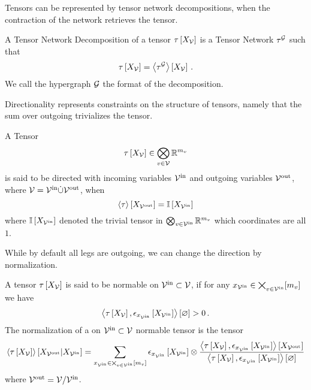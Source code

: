 
Tensors can be represented by tensor network decompositions, when the contraction of the network retrieves the tensor.

\begin{definition}\label{def:tnDecomposition}
	A Tensor Network Decomposition of a tensor $\tau\left[X_{\mathcal{V}}\right]$ is a Tensor Network $\tau^{\mathcal{G}}$ such that
		\[ \tau\left[X_{\mathcal{V}}\right]= \left\langle \tau^{\mathcal{G}}\right\rangle \left[ X_{\mathcal{V}} \right] \, . \]
	We call the hypergraph $\mathcal{G}$ the format of the decomposition.
\end{definition}






Directionality represents constraints on the structure of tensors, namely that the sum over outgoing trivializes the tensor.

\begin{definition}\label{def:directedTensor}
	A Tensor
		\[ \tau\left[X_{\mathcal{V}}\right] \in\bigotimes_{v\in\mathcal{V}}\mathbb{R}^{m_{v}} \]
	is said to be directed with incoming variables $\mathcal{V}^{\mathrm{in}}$ and outgoing variables $\mathcal{V}^{\mathrm{out}}$, where $\mathcal{V}=\mathcal{V}^{\mathrm{in}}\dot{\cup}\mathcal{V}^{\mathrm{out}}$, when
		\[ \left\langle \tau\right\rangle \left[ X_{\mathcal{V}^{\mathrm{out}}} \right] =  \mathbb{I}\left[X_{\mathcal{V}^{\mathrm{in}}}\right] \]
	where $\mathbb{I}\left[X_{\mathcal{V}^{\mathrm{in}}}\right]$ denoted the trivial tensor in  $\bigotimes_{v\in\mathcal{V}^{\mathrm{in}}}\mathbb{R}^{m_{v}}$ which coordinates are all $1$.
\end{definition}

While by default all legs are outgoing, we can change the direction by normalization.

\begin{definition}\label{def:normalization}
	A tensor $\tau\left[X_{\mathcal{V}}\right]$ is said to be normable on $\mathcal{V}^{\mathrm{in}}\subset\mathcal{V}$, if for any $x_{\mathcal{V}^{\mathrm{in}}}\in\bigtimes_{v\in\mathcal{V}^{\mathrm{in}}}[m_{v}]$ we have
		\[ \left\langle \tau\left[X_{\mathcal{V}}\right],\epsilon_{x_{\mathcal{V}^{\mathrm{in}}}}\left[X_{\mathcal{V}^{\mathrm{in}}}\right]\right\rangle \left[ \varnothing \right] > 0 \, . \]
	The normalization of a on $\mathcal{V}^{\mathrm{in}}\subset\mathcal{V}$ normable tensor is the tensor
	\begin{align*}
		\left\langle \tau\left[X_{\mathcal{V}}\right]\right\rangle \left[ X_{\mathcal{V}^{\mathrm{out}}} | X_{\mathcal{V}^{\mathrm{in}}} \right] =
		\sum_{x_{\mathcal{V}^{\mathrm{in}}}\in\bigtimes_{v\in\mathcal{V}^{\mathrm{in}}}[m_{v}]}
		\epsilon_{x_{\mathcal{V}^{\mathrm{in}}}}\left[X_{\mathcal{V}^{\mathrm{in}}}\right] \otimes \frac{
		\left\langle \tau\left[X_{\mathcal{V}}\right],\epsilon_{x_{\mathcal{V}^{\mathrm{in}}}}\left[X_{\mathcal{V}^{\mathrm{in}}}\right]\right\rangle \left[ X_{\mathcal{V}^{\mathrm{out}}} \right]
		}{
		\left\langle \tau\left[X_{\mathcal{V}}\right],\epsilon_{x_{\mathcal{V}^{\mathrm{in}}}}\left[X_{\mathcal{V}^{\mathrm{in}}}\right]\right\rangle \left[ \varnothing \right]
		}
	\end{align*}
	where $\mathcal{V}^{\mathrm{out}} = \mathcal{V}/\mathcal{V}^{\mathrm{in}}$.
\end{definition}


